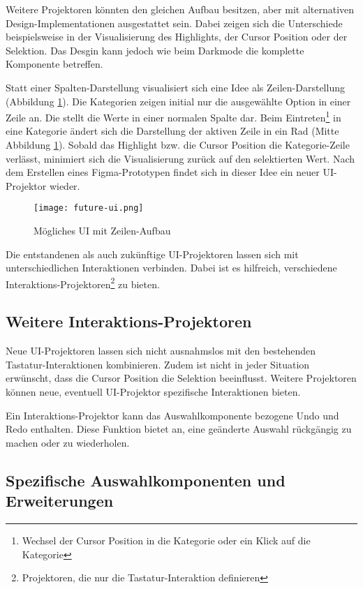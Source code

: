 Weitere Projektoren könnten den gleichen Aufbau besitzen, aber mit alternativen Design-Implementationen ausgestattet sein. 
Dabei zeigen sich die Unterschiede beispielsweise in der Visualisierung des Highlights, der Cursor Position oder der Selektion. 
Das Desgin kann jedoch wie beim Darkmode die komplette Komponente betreffen. 

Statt einer Spalten-Darstellung visualisiert sich eine Idee als Zeilen-Darstellung (Abbildung \ref{img:futureUi}). 
Die Kategorien zeigen initial nur die ausgewählte Option in einer Zeile an. 
Die  stellt die Werte in einer normalen Spalte dar. 
Beim Eintreten\footnote{
    Wechsel der Cursor Position in die Kategorie oder ein Klick auf die Kategorie
} in eine Kategorie ändert sich die Darstellung der aktiven Zeile in ein Rad (Mitte Abbildung \ref{img:futureUi}). 
Sobald das Highlight bzw. die Cursor Position die Kategorie-Zeile verlässt, minimiert sich die Visualisierung zurück auf den selektierten Wert. 
Nach dem Erstellen eines Figma-Prototypen findet sich in dieser Idee ein neuer UI-Projektor wieder. 

\begin{figure}[!htb]
    \centering
    \texttt{[image: future-ui.png]}
    \caption{\centering Mögliches UI mit Zeilen-Aufbau}
    \label{img:futureUi}
\end{figure}

Die entstandenen als auch zukünftige UI-Projektoren lassen sich mit unterschiedlichen Interaktionen verbinden. 
Dabei ist es hilfreich, verschiedene Interaktions-Projektoren\footnote{
    Projektoren, die nur die Tastatur-Interaktion definieren
} zu bieten. 


\subsection{Weitere Interaktions-Projektoren}
\label{sec:moreInteraction}

Neue UI-Projektoren lassen sich nicht ausnahmslos mit den bestehenden Tastatur-Inter\-aktionen kombinieren. 
Zudem ist nicht in jeder Situation erwünscht, dass die Cursor Position die Selektion beeinflusst. 
Weitere Projektoren können neue, eventuell UI-Projektor spezifische Interaktionen bieten. 

Ein Interaktions-Projektor kann das Auswahlkomponente bezogene Undo und Redo enthalten. 
Diese Funktion bietet an, eine geänderte Auswahl rückgängig zu machen oder zu wiederholen. 


\subsection{Spezifische Auswahlkomponenten und Erweiterungen}
\label{sec:specificComponents}

